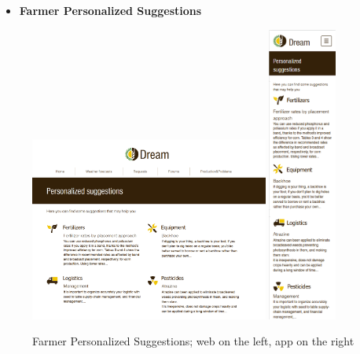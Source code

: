 \documentclass{article}
\begin{document}
    \begin{itemize}
        \item \textbf{Farmer Personalized Suggestions}
    \end{itemize}
        \begin{figure} [h]
            \centering
            \includegraphics[width=0.7\textwidth]{images/UserInterfaces/Farmer/PersonalizedSuggestions/PersonalizedSuggestionsWeb.png}
            \quad
            \includegraphics[width=0.2\textwidth]{images/UserInterfaces/Farmer/PersonalizedSuggestions/PersonalizedSuggestionsApp.png}
            \quad
            \caption{\label{fig:farmerPersonalizedSuggestions}Farmer Personalized Suggestions; web on the left, app on the right}
        \end{figure}
        \newpage
\end{document}
